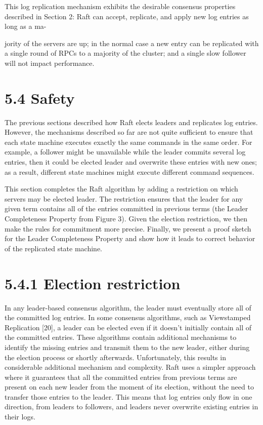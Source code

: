 \documentclass[
]{article}
\begin{document}
This log replication mechanism exhibits the desirable consensus
properties described in Section 2: Raft can accept, replicate, and apply
new log entries as long as a ma-

jority of the servers are up; in the normal case a new entry can be
replicated with a single round of RPCs to a majority of the cluster; and
a single slow follower will not impact performance.

\section{5.4 Safety}\label{safety}

The previous sections described how Raft elects leaders and replicates
log entries. However, the mechanisms described so far are not quite
sufficient to ensure that each state machine executes exactly the same
commands in the same order. For example, a follower might be unavailable
while the leader commits several log entries, then it could be elected
leader and overwrite these entries with new ones; as a result, different
state machines might execute different command sequences.

This section completes the Raft algorithm by adding a restriction on
which servers may be elected leader. The restriction ensures that the
leader for any given term contains all of the entries committed in
previous terms (the Leader Completeness Property from Figure 3). Given
the election restriction, we then make the rules for commitment more
precise. Finally, we present a proof sketch for the Leader Completeness
Property and show how it leads to correct behavior of the replicated
state machine.

\section{5.4.1 Election restriction}\label{election-restriction}

In any leader-based consensus algorithm, the leader must eventually
store all of the committed log entries. In some consensus algorithms,
such as Viewstamped Replication {[}20{]}, a leader can be elected even
if it doesn't initially contain all of the committed entries. These
algorithms contain additional mechanisms to identify the missing entries
and transmit them to the new leader, either during the election process
or shortly afterwards. Unfortunately, this results in considerable
additional mechanism and complexity. Raft uses a simpler approach where
it guarantees that all the committed entries from previous terms are
present on each new leader from the moment of its election, without the
need to transfer those entries to the leader. This means that log
entries only flow in one direction, from leaders to followers, and
leaders never overwrite existing entries in their logs.
\end{document}
